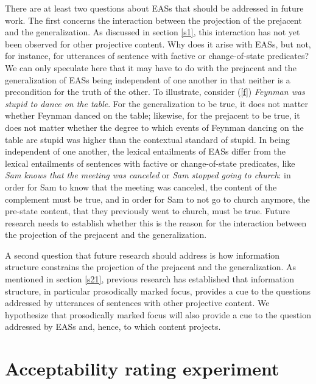 \documentclass[11pt,fleqn]{article}
\newcommand{\6}{\mbox{$[\hspace*{-.6mm}[$}}
\newcommand{\9}{\mbox{$]\hspace*{-.6mm}]$}}
\begin{document}
There are at least two questions about EASs that should be addressed in future work. The first concerns the interaction between the projection of the prejacent and the generalization. As discussed in section \ref{s1}, this interaction has not yet been observed for other projective content. Why does it arise with EASs, but not, for instance, for utterances of sentence with factive or change-of-state predicates? We can only speculate here that it may have to do with the prejacent and the generalization of EASs being independent of one another in that neither is a precondition for the truth of the other. To illustrate, consider (\ref{f}) {\em Feynman was stupid to dance on the table}. For the generalization to be true, it does not matter whether Feynman danced on the table; likewise, for the prejacent to be true, it does not matter whether the degree to which events of Feynman dancing on the table are stupid was higher than the contextual standard of stupid. In being independent of one another, the lexical entailments of EASs differ from the lexical entailments of sentences with factive or change-of-state predicates, like {\em Sam knows that the meeting was canceled} or {\em Sam stopped going to church}: in order for Sam to know that the meeting was canceled, the content of the complement must be true, and in order for Sam to not go to church anymore, the pre-state content, that they previously went to church, must be true. Future research needs to establish whether this is the reason for the interaction between the projection of the prejacent and the generalization.

A second question that future research should address is how information structure constrains the projection of the prejacent and the generalization. As mentioned in section \ref{s21}, previous research has established that information structure, in particular prosodically marked focus, provides a cue to the questions addressed by utterances of sentences with other projective content. We hypothesize that prosodically marked focus will also provide a cue to the question addressed by EASs and, hence, to which content projects. 



\appendix

\section{Acceptability rating experiment}\label{s-acc}
\end{document}
